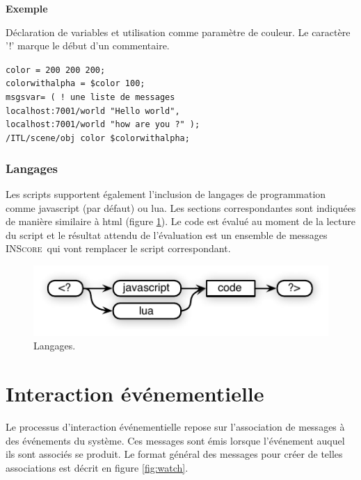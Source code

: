 \documentclass{article}
\newcommand{\inscore}		{\textsc{\small INScore}}
\newcommand{\sample}	[1]		{\begin{center}\colorbox{mygrey}{
								\begin{minipage}[t]{0.95\columnwidth} 
								{\small \texttt{#1}}
								\end{minipage}}\end{center}}
\newcounter{excount}
\newcommand{\exemple}			{\vspace{1mm} \hspace*{-4.5mm}\textbf{Exemple \arabic{excount}} \addtocounter{excount}{1}}
\begin{document}
\exemple  Déclaration de variables et utilisation comme paramètre de couleur. Le caractère '!' marque le début d'un commentaire.
\vspace{-1mm}\sample{color = 200 200 200; \\
colorwithalpha = \$color 100;\\
msgsvar= ( ! une liste de messages\\
\hspace*{3mm}localhost:7001/world "Hello world",\\ 
\hspace*{3mm}localhost:7001/world "how are you ?" ); \\ 
/ITL/scene/obj color \$colorwithalpha;
 }

\subsubsection{Langages}

Les scripts supportent également l'inclusion de langages de programmation comme javascript (par défaut) ou lua. Les sections correspondantes sont indiquées de manière similaire à html (figure \ref{fig:lang}). Le code est évalué au moment de la lecture du script et le résultat attendu de l'évaluation est un ensemble de messages \inscore\ qui vont remplacer le script correspondant.

\begin{figure}[htbp]
\centerline{
	\includegraphics[width=0.8\columnwidth]{imgs/scripts}}
\caption{Langages.}
\label{fig:lang}
\end{figure}


\section{Interaction événementielle}\label{sec:interaction}

Le processus d'interaction événementielle repose sur l'association de messages à des événements du système. Ces messages sont émis lorsque l'événement auquel ils sont associés se produit. Le format général des messages pour créer de telles associations est décrit en figure \ref{fig:watch}.
\end{document}
